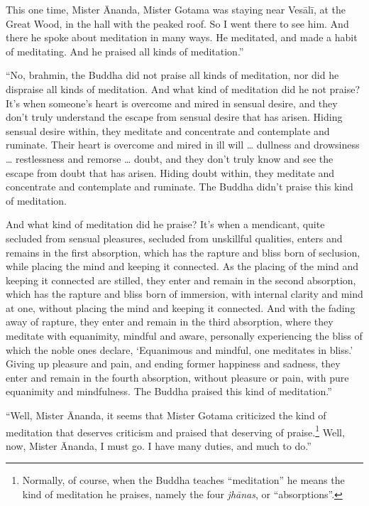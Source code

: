 \documentclass[12pt,openany]{book}%
\begin{document}
This one time, Mister Ānanda, Mister Gotama was staying near \textsanskrit{Vesālī}, at the Great Wood, in the hall with the peaked roof. So I went there to see him. And there he spoke about meditation in many ways. He meditated, and made a habit of meditating. And he praised all kinds of meditation.” 

“No, brahmin, the Buddha did not praise all kinds of meditation, nor did he dispraise all kinds of meditation. And what kind of meditation did he not praise? It’s when someone’s heart is overcome and mired in sensual desire, and they don’t truly understand the escape from sensual desire that has arisen. Hiding sensual desire within, they meditate and concentrate and contemplate and ruminate. Their heart is overcome and mired in ill will … dullness and drowsiness … restlessness and remorse … doubt, and they don’t truly know and see the escape from doubt that has arisen. Hiding doubt within, they meditate and concentrate and contemplate and ruminate. The Buddha didn’t praise this kind of meditation. 

And what kind of meditation did he praise? It’s when a mendicant, quite secluded from sensual pleasures, secluded from unskillful qualities, enters and remains in the first absorption, which has the rapture and bliss born of seclusion, while placing the mind and keeping it connected. As the placing of the mind and keeping it connected are stilled, they enter and remain in the second absorption, which has the rapture and bliss born of immersion, with internal clarity and mind at one, without placing the mind and keeping it connected. And with the fading away of rapture, they enter and remain in the third absorption, where they meditate with equanimity, mindful and aware, personally experiencing the bliss of which the noble ones declare, ‘Equanimous and mindful, one meditates in bliss.’ Giving up pleasure and pain, and ending former happiness and sadness, they enter and remain in the fourth absorption, without pleasure or pain, with pure equanimity and mindfulness. The Buddha praised this kind of meditation.” 

“Well, Mister Ānanda, it seems that Mister Gotama criticized the kind of meditation that deserves criticism and praised that deserving of praise.\footnote{Normally, of course, when the Buddha teaches “meditation” he means the kind of meditation he praises, namely the four \textit{\textsanskrit{jhānas}}, or “absorptions”. } Well, now, Mister Ānanda, I must go. I have many duties, and much to do.” 
\end{document}

